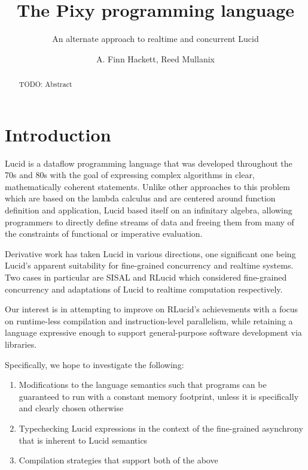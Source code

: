\documentclass{scrartcl}
\begin{document}
    \title{The Pixy programming language}
    \subtitle{An alternate approach to realtime and concurrent Lucid}
    \author{A. Finn Hackett, Reed Mullanix}
    
    \maketitle
    
    \begin{abstract}
        TODO: Abstract
    \end{abstract}

    \tableofcontents

    \section{Introduction}

    Lucid is a dataflow programming language that was developed throughout the 70s and 80s with the goal of expressing complex algorithms in clear, mathematically coherent statements. Unlike other approaches to this problem which are based on the lambda calculus and are centered around function definition and application, Lucid based itself on an infinitary algebra, allowing programmers to directly define streams of data and freeing them from many of the constraints of functional or imperative evaluation.

    Derivative work has taken Lucid in various directions, one significant one being Lucid's apparent suitability for fine-grained concurrency and realtime systems. Two cases in particular are SISAL and RLucid which considered fine-grained concurrency and adaptations of Lucid to realtime computation respectively.

    Our interest is in attempting to improve on RLucid's achievements with a focus on runtime-less compilation and instruction-level parallelism, while retaining a language expressive enough to support general-purpose software development via libraries.

    Specifically, we hope to investigate the following:
    \begin{enumerate}
        \item Modifications to the language semantics such that programs can be guaranteed to run with a constant memory footprint, unless it is specifically and clearly chosen otherwise
        \item Typechecking Lucid expressions in the context of the fine-grained asynchrony that is inherent to Lucid semantics
        \item Compilation strategies that support both of the above
    \end{enumerate}
\end{document}
